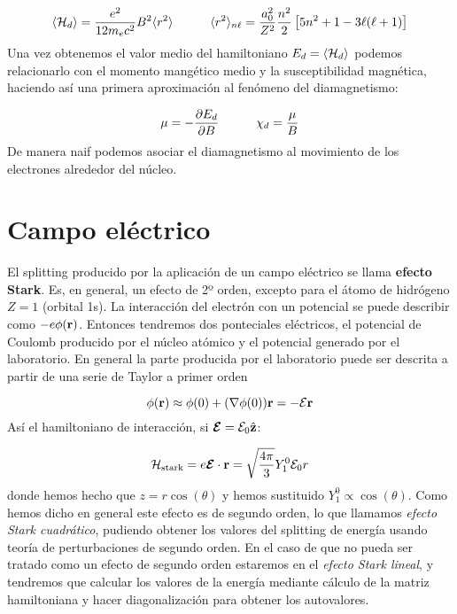 \begin{equation}
	\langle \mathcal{H}_d \rangle = \frac{e^2}{12m_ec^2} B^2 \langle r^2 \rangle \quad \quad \quad \langle r^2 \rangle_{n\ell} = \frac{a_0^2}{Z^2} \frac{n^2}{2} \left[ 5n^2 + 1 - 3 \ell (\ell + 1) \right]
\end{equation}
Una vez obtenemos el valor medio del hamiltoniano $E_d = \langle \mathcal{H}_d \rangle$ podemos relacionarlo con el momento mangético medio y la susceptibilidad magnética, haciendo así una primera aproximación al fenómeno del diamagnetismo:
 
\begin{equation}
	\mu = - \frac{\partial E_d}{\partial B} \quad \quad \quad \chi_d = \frac{\mu}{B}
\end{equation}
De manera naif podemos asociar el diamagnetismo al movimiento de los electrones alrededor del núcleo.


\section{Campo eléctrico}

El splitting producido por la aplicación de un campo eléctrico se llama \textbf{efecto Stark}. Es, en general, un efecto de 2º orden, excepto para el átomo de hidrógeno $Z=1$ (orbital 1s). La interacción del electrón con un potencial se puede describir como $-e\phi(\mathbf{r})$. Entonces tendremos dos ponteciales eléctricos, el potencial de Coulomb producido por el núcleo atómico y el potencial generado por el laboratorio. En general la parte producida por el laboratorio puede ser descrita a partir de una serie de Taylor a primer orden

\begin{equation}
	 \phi(\mathbf{r}) \approx \phi(0) + (\nabla \phi(0)) \mathbf{r} = - \mathcal{E} \mathbf{r}
\end{equation}
Así el hamiltoniano de interacción, si $\boldsymbol{\mathcal{E}} = \mathcal{E}_0 \hat{\mathbf{z}}$:

\begin{equation}
	\mathcal{H}_{\text{stark}} = e \boldsymbol{\mathcal{E}} \cdot \mathbf{r} = \sqrt{\frac{4\pi}{3}} Y_1^0 \mathcal{E}_0 r
\end{equation}
donde hemos hecho que $z = r \cos (\theta)$ y hemos sustituido $Y_1^0 \propto \cos (\theta)$. Como hemos dicho en general este efecto es de segundo orden, lo que llamamos \textit{efecto Stark cuadrático}, pudiendo obtener los valores del splitting de energía usando teoría de perturbaciones de segundo orden. En el caso de que no pueda ser tratado como un efecto de segundo orden estaremos en el \textit{efecto Stark lineal}, y tendremos que calcular los valores de la energía mediante cálculo de la matriz hamiltoniana y hacer diagonalización para obtener los autovalores.

